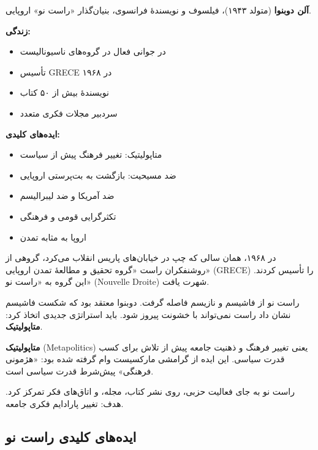 \begin{tcolorbox}[
    enhanced,
    colback=gray!5,
    colframe=darkgray,
    boxrule=2pt,
    arc=10pt,
    shadow={2mm}{-2mm}{0mm}{black!30},
    fonttitle=\bfseries\large,
    title={\rl{👤 پرترهٔ متفکر: آلن دوبنوا}}
]

\textbf{آلن دوبنوا} (متولد ۱۹۴۳)، فیلسوف و نویسندهٔ فرانسوی، بنیان‌گذار «راست نو» اروپایی.

\textbf{زندگی:}
\begin{itemize}
    \item در جوانی فعال در گروه‌های ناسیونالیست
    \item تأسیس GRECE در ۱۹۶۸
    \item نویسندهٔ بیش از ۵۰ کتاب
    \item سردبیر مجلات فکری متعدد
\end{itemize}



\textbf{ایده‌های کلیدی:}
\begin{itemize}
    \item متاپولیتیک: تغییر فرهنگ پیش از سیاست
    \item ضد مسیحیت: بازگشت به بت‌پرستی اروپایی
    \item ضد آمریکا و ضد لیبرالیسم
    \item تکثرگرایی قومی و فرهنگی
    \item اروپا به مثابه تمدن
\end{itemize}

\end{tcolorbox}


در ۱۹۶۸، همان سالی که چپ در خیابان‌های پاریس انقلاب می‌کرد، گروهی از روشنفکران راست «گروه تحقیق و مطالعهٔ تمدن اروپایی» (GRECE) را تأسیس کردند. این گروه به «راست نو» (Nouvelle Droite) شهرت یافت.

راست نو از فاشیسم و نازیسم فاصله گرفت. دوبنوا معتقد بود که شکست فاشیسم نشان داد راست نمی‌تواند با خشونت پیروز شود. باید استراتژی جدیدی اتخاذ کرد: \textbf{متاپولیتیک}.

\textbf{متاپولیتیک} (Metapolitics) یعنی تغییر فرهنگ و ذهنیت جامعه پیش از تلاش برای کسب قدرت سیاسی. این ایده از گرامشی مارکسیست وام گرفته شده بود: «هژمونی فرهنگی» پیش‌شرط قدرت سیاسی است.

راست نو به جای فعالیت حزبی، روی نشر کتاب، مجله، و اتاق‌های فکر تمرکز کرد. هدف: تغییر پارادایم فکری جامعه.


\subsection{ایده‌های کلیدی راست نو}


